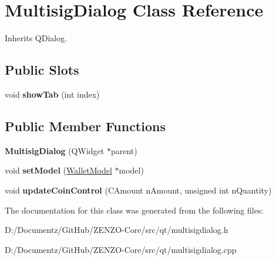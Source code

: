 \hypertarget{class_multisig_dialog}{}\section{Multisig\+Dialog Class Reference}
\label{class_multisig_dialog}


Inherits Q\+Dialog.

\subsection*{Public Slots}
\begin{DoxyCompactItemize}
\item 
\mbox{\label{class_multisig_dialog_a2fc79dce0675edaa3e25caf8969a77b5}} 
void {\bfseries show\+Tab} (int index)
\end{DoxyCompactItemize}
\subsection*{Public Member Functions}
\begin{DoxyCompactItemize}
\item 
\mbox{\label{class_multisig_dialog_af8ff2a9f6dc05a9468d955cb428c6474}} 
{\bfseries Multisig\+Dialog} (Q\+Widget $\ast$parent)
\item 
\mbox{\label{class_multisig_dialog_ae2709a2ffd629acafa4c90811402c64a}} 
void {\bfseries set\+Model} (\mbox{\hyperlink{class_wallet_model}{Wallet\+Model}} $\ast$model)
\item 
\mbox{\label{class_multisig_dialog_ad0e2804a0a618393be5ea6b4752052e2}} 
void {\bfseries update\+Coin\+Control} (C\+Amount n\+Amount, unsigned int n\+Quantity)
\end{DoxyCompactItemize}


The documentation for this class was generated from the following files\+:\begin{DoxyCompactItemize}
\item 
D\+:/\+Documentz/\+Git\+Hub/\+Z\+E\+N\+Z\+O-\/\+Core/src/qt/multisigdialog.\+h\item 
D\+:/\+Documentz/\+Git\+Hub/\+Z\+E\+N\+Z\+O-\/\+Core/src/qt/multisigdialog.\+cpp\end{DoxyCompactItemize}
